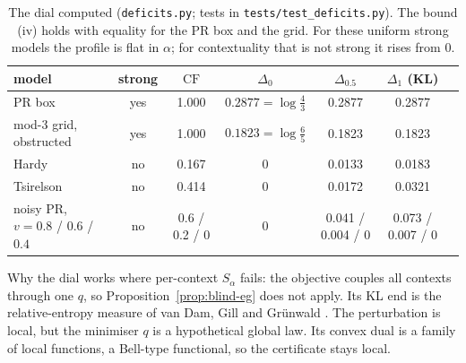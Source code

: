 \documentclass[11pt]{article}
\theoremstyle{definition}
\theoremstyle{remark}
\newcommand{\CF}{\mathrm{CF}}
\newcommand{\st}[1]{\textsf{\small\color{gray}#1}}
\begin{document}
\begin{table}[h]\centering\small
{\setlength\tabcolsep{3pt}\begin{tabular}{lcccccc}
\toprule
model & strong & $\CF$ & $\Delta_0$ & $\Delta_{0.5}$ & $\Delta_1$ (KL)\\
\midrule
PR box & yes & 1.000 & $0.2877=\log\frac43$ & 0.2877 & 0.2877\\
mod-3 grid, obstructed & yes & 1.000 & $0.1823=\log\frac65$ & 0.1823 & 0.1823\\
Hardy & no & 0.167 & 0 & 0.0133 & 0.0183\\
Tsirelson & no & 0.414 & 0 & 0.0172 & 0.0321\\
noisy PR, $v=0.8$ / $0.6$ / $0.4$ & no & 0.6 / 0.2 / 0 & 0 & 0.041 / 0.004 / 0 & 0.073 / 0.007 / 0\\
\bottomrule
\end{tabular}}
\caption{The dial \st{computed} (\texttt{deficits.py}; tests in \texttt{tests/test\_deficits.py}). The bound (iv) holds with equality for the PR box and the grid. For these uniform strong models the profile is flat in $\alpha$; for contextuality that is not strong it rises from $0$.}
\end{table}

\noindent Why the dial works where per-context $S_\alpha$ fails: the objective couples all contexts through one $q$, so Proposition~\ref{prop:blind-eg} does not apply. Its KL end is the relative-entropy measure of van Dam, Gill and Gr\"unwald \cite{vdgg}. The perturbation is local, but the minimiser $q$ is a hypothetical global law. Its convex dual is a family of local functions, a Bell-type functional, so the certificate stays local.
\end{document}
